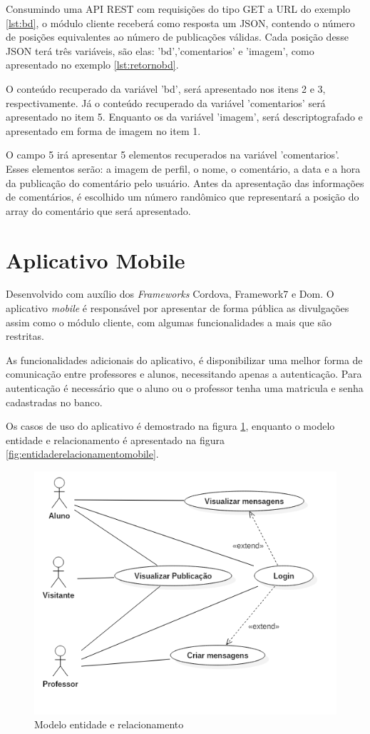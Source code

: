 Consumindo uma API REST com requisições do tipo GET a URL do exemplo \ref{lst:bd}, o módulo cliente receberá como resposta um JSON, contendo o número de posições equivalentes ao número de publicações válidas. Cada posição desse JSON terá três variáveis, são elas: 'bd','comentarios' e 'imagem', como apresentado no exemplo \ref{lst:retornobd}. 

O conteúdo recuperado da variável 'bd', será apresentado nos itens 2 e 3, respectivamente. Já o conteúdo recuperado da variável 'comentarios' será apresentado no item 5. Enquanto os da variável 'imagem', será descriptografado e apresentado em forma de imagem no item 1.

O campo 5 irá apresentar 5 elementos recuperados na variável 'comentarios'. Esses elementos serão: a imagem de perfil, o nome, o comentário, a data e a hora da publicação do comentário pelo usuário. Antes da apresentação das informações de comentários, é escolhido um número randômico que representará a posição do array do comentário que será apresentado.

\section{Aplicativo Mobile}
Desenvolvido com auxílio dos \textit{Frameworks} Cordova, Framework7 e Dom. O aplicativo \textit{mobile} é responsável por apresentar de forma pública as divulgações assim como o módulo cliente, com algumas funcionalidades a mais que são restritas.

As funcionalidades adicionais do aplicativo, é disponibilizar uma melhor forma de comunicação entre professores e alunos, necessitando apenas a autenticação. Para autenticação é necessário que o aluno ou o professor tenha uma matricula e senha cadastradas no banco.

Os casos de uso do aplicativo é demostrado na figura \ref{fig:casosdeusomobile}, enquanto o modelo entidade e relacionamento é apresentado na figura \ref{fig:entidaderelacionamentomobile}.
\begin{figure}[H]
\centering
\includegraphics[scale=0.4]{figuras/CasosDeUsoMobile}
\caption{Modelo entidade e relacionamento}
\label{fig:casosdeusomobile}
\end{figure}

